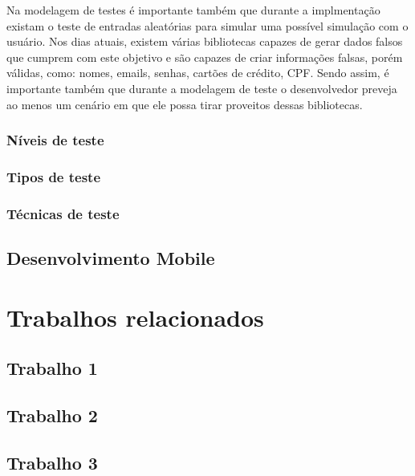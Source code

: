 \documentclass[
    12pt,       %
    openright,      %
    twoside,      %
    a4paper,      %
    english,      %
    french,       %
    spanish,      %
    brazil,       %
    ]{abntex2}
\begin{document}
          Na modelagem de testes é importante também que durante a implmentação existam
          o teste de entradas aleatórias para simular uma possível simulação com o usuário.
          Nos dias atuais, existem várias bibliotecas capazes de gerar dados falsos que
          cumprem com este objetivo e são capazes de criar informações falsas, porém válidas,
          como: nomes, emails, senhas, cartões de crédito, CPF. Sendo assim, é importante
          também que durante a modelagem de teste o desenvolvedor preveja ao menos um cenário
          em que ele possa tirar proveitos dessas bibliotecas.



      \section{Níveis de teste}
      \section{Tipos de teste}
      \section{Técnicas de teste}

  \chapter{Desenvolvimento Mobile}

  \part{Trabalhos relacionados}

  \chapter{Trabalho 1}

  \chapter{Trabalho 2}

  \chapter{Trabalho 3}
\end{document}
